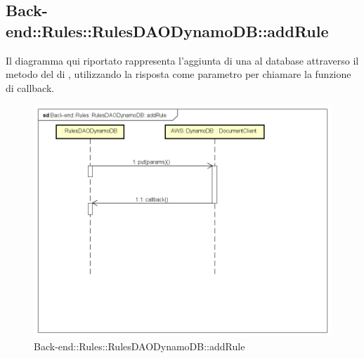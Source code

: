 \subsection{Back-end::Rules::RulesDAODynamoDB::addRule}
Il diagramma qui riportato rappresenta l'aggiunta di una  al database attraverso il metodo  del  di , utilizzando la risposta come parametro per chiamare la funzione di callback.
\begin{figure}[h] \centering \includegraphics[width=\textwidth,height=\textheight,keepaspectratio]{images/diagrams/back-end/Ufficial_Backend/Back-endRulesRulesDAODynamoDBaddRule.png} 	\caption{Back-end::Rules::RulesDAODynamoDB::addRule}
\end{figure}
\newpage


